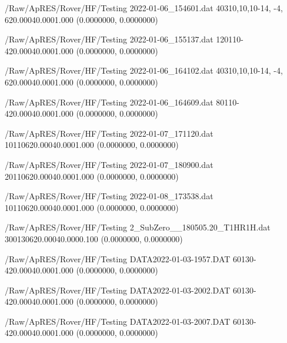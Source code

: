 \hfaprestable
{/Raw/ApRES/Rover/HF/Testing}%
{2022-01-06\_154601.dat}%
{40}{3}{10,10,10}{-14, -4,  6}{20.000}{40.000}{1.000}%
{ (0.0000000, 0.0000000)}%
{}%
{}%

\hfaprestable
{/Raw/ApRES/Rover/HF/Testing}%
{2022-01-06\_155137.dat}%
{120}{1}{10}{-4}{20.000}{40.000}{1.000}%
{ (0.0000000, 0.0000000)}%
{}%
{}%

\hfaprestable
{/Raw/ApRES/Rover/HF/Testing}%
{2022-01-06\_164102.dat}%
{40}{3}{10,10,10}{-14, -4,  6}{20.000}{40.000}{1.000}%
{ (0.0000000, 0.0000000)}%
{}%
{}%

\hfaprestable
{/Raw/ApRES/Rover/HF/Testing}%
{2022-01-06\_164609.dat}%
{80}{1}{10}{-4}{20.000}{40.000}{1.000}%
{ (0.0000000, 0.0000000)}%
{}%
{}%

\hfaprestable
{/Raw/ApRES/Rover/HF/Testing}%
{2022-01-07\_171120.dat}%
{10}{1}{10}{6}{20.000}{40.000}{1.000}%
{ (0.0000000, 0.0000000)}%
{}%
{}%

\hfaprestable
{/Raw/ApRES/Rover/HF/Testing}%
{2022-01-07\_180900.dat}%
{20}{1}{10}{6}{20.000}{40.000}{1.000}%
{ (0.0000000, 0.0000000)}%
{}%
{}%

\hfaprestable
{/Raw/ApRES/Rover/HF/Testing}%
{2022-01-08\_173538.dat}%
{10}{1}{10}{6}{20.000}{40.000}{1.000}%
{ (0.0000000, 0.0000000)}%
{}%
{}%

\hfaprestable
{/Raw/ApRES/Rover/HF/Testing}%
{2\_SubZero\_\_180505.20\_T1HR1H.dat}%
{300}{1}{30}{6}{20.000}{40.000}{0.100}%
{ (0.0000000, 0.0000000)}%
{}%
{}%

\hfaprestable
{/Raw/ApRES/Rover/HF/Testing}%
{DATA2022-01-03-1957.DAT}%
{60}{1}{30}{-4}{20.000}{40.000}{1.000}%
{ (0.0000000, 0.0000000)}%
{}%
{}%

\hfaprestable
{/Raw/ApRES/Rover/HF/Testing}%
{DATA2022-01-03-2002.DAT}%
{60}{1}{30}{-4}{20.000}{40.000}{1.000}%
{ (0.0000000, 0.0000000)}%
{}%
{}%

\hfaprestable
{/Raw/ApRES/Rover/HF/Testing}%
{DATA2022-01-03-2007.DAT}%
{60}{1}{30}{-4}{20.000}{40.000}{1.000}%
{ (0.0000000, 0.0000000)}%
{}%
{}%

